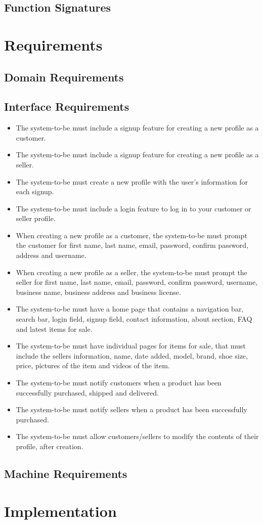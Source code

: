 \subsection{Function Signatures}
\newpage
\section{Requirements}
\subsection{Domain Requirements}
\subsection{Interface Requirements}
\begin{itemize}
    \item The system-to-be must include a signup feature for creating a new profile as a customer.
    \item The system-to-be must include a signup feature for creating a new profile as a seller.
    \item The system-to-be must create a new profile with the user's information for each signup.
    \item The system-to-be must include a login feature to log in to your customer or seller profile.
    \item When creating a new profile as a customer, the system-to-be must prompt the customer for first name, last name, email, password, confirm password, address and username.
    \item When creating a new profile as a seller, the system-to-be must prompt the seller for first name, last name, email, password, confirm password, username, business name, business address and business license.
    \item The system-to-be must have a home page that contains a navigation bar, search bar, login field, signup field, contact information, about section, FAQ and latest items for sale.
    \item The system-to-be must have individual pages for items for sale, that must include the sellers information, name, date added, model, brand, shoe size, price, pictures of the item and videos of the item.
    \item The system-to-be must notify customers when a product has been successfully purchased, shipped and delivered.
    \item The system-to-be must notify sellers when a product has been successfully purchased.
    \item The system-to-be must allow customers/sellers to modify the contents of their profile, after creation.
\end{itemize}
\subsection{Machine Requirements}
\section{Implementation}
